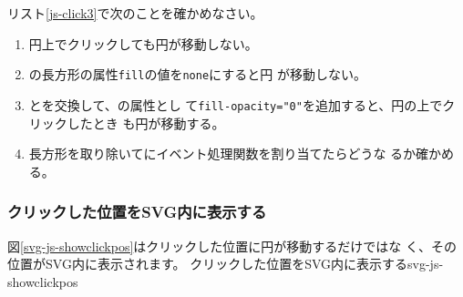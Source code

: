 \begin{Problem}\upshape
リスト\ref{js-click3}で次のことを確かめなさい。
\begin{enumerate}
 \item 円上でクリックしても円が移動しない。
 \item {}の長方形の属性\texttt{fill}の値を\texttt{none}にすると円
       が移動しない。
 \item {}とを交換して、の属性とし
       て\texttt{fill-opacity="0"}を追加すると、円の上でクリックしたとき
       も円が移動する。
 \item 長方形を取り除いてにイベント処理関数を割り当てたらどうな
       るか確かめる。
\end{enumerate}
\end{Problem}

\subsubsection{クリックした位置をSVG内に表示する}
図\ref{svg-js-showclickpos}はクリックした位置に円が移動するだけではな
く、その位置がSVG内に表示されます。
{クリックした位置をSVG内に表示する}{svg-js-showclickpos}

